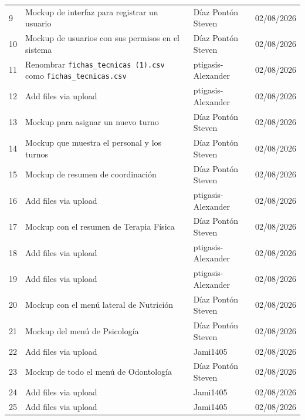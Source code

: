 \documentclass[11pt,a4paper]{article}
\begin{document}
\begin{longtable}{
			p{}
			p{}
			p{}
			p{}
		}
		9 &
		Mockup de interfaz para registrar un usuario &
		Díaz Pontón Steven &
		02/08/2026 \\
		
		10 &
		Mockup de usuarios con sus permisos en el sistema &
		Díaz Pontón Steven &
		02/08/2026 \\
		
		11 &
		Renombrar \texttt{fichas\_tecnicas (1).csv} como
		\texttt{fichas\_tecnicas.csv} &
		ptigasis-Alexander &
		02/08/2026 \\
		
		12 &
		Add files via upload &
		ptigasis-Alexander &
		02/08/2026 \\
		
		13 &
		Mockup para asignar un nuevo turno &
		Díaz Pontón Steven &
		02/08/2026 \\
		
		14 &
		Mockup que muestra el personal y los turnos &
		Díaz Pontón Steven &
		02/08/2026 \\
		
		15 &
		Mockup de resumen de coordinación &
		Díaz Pontón Steven &
		02/08/2026 \\
		
		16 &
		Add files via upload &
		ptigasis-Alexander &
		02/08/2026 \\
		
		17 &
		Mockup con el resumen de Terapia Física &
		Díaz Pontón Steven &
		02/08/2026 \\
		
		18 &
		Add files via upload &
		ptigasis-Alexander &
		02/08/2026 \\
		
		19 &
		Add files via upload &
		ptigasis-Alexander &
		02/08/2026 \\
		
		20 &
		Mockup con el menú lateral de Nutrición &
		Díaz Pontón Steven &
		02/08/2026 \\
		
		21 &
		Mockup del menú de Psicología &
		Díaz Pontón Steven &
		02/08/2026 \\
		
		22 &
		Add files via upload &
		Jami1405 &
		02/08/2026 \\
		
		23 &
		Mockup de todo el menú de Odontología &
		Díaz Pontón Steven &
		02/08/2026 \\
		
		24 &
		Add files via upload &
		Jami1405 &
		02/08/2026 \\
		
		25 &
		Add files via upload &
		Jami1405 &
		02/08/2026 \\
		
	\end{longtable}
	\endgroup
	
\end{document}
